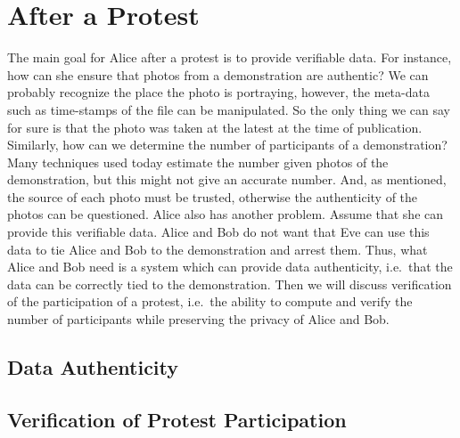 \section{After a Protest}
\label{AfterProtest}

The main goal for Alice after a protest is to provide verifiable data.
For instance, how can she ensure that photos from a demonstration are 
authentic?
We can probably recognize the place the photo is portraying, however, the 
meta-data such as time-stamps of the file can be manipulated.
So the only thing we can say for sure is that the photo was taken at the latest 
at the time of publication.
Similarly, how can we determine the number of participants of a demonstration?
Many techniques used today estimate the number given photos of the 
demonstration, but this might not give an accurate number.
And, as mentioned, the source of each photo must be trusted, otherwise the 
authenticity of the photos can be questioned.
Alice also has another problem.
Assume that she can provide this verifiable data.
Alice and Bob do not want that Eve can use this data to tie Alice
and Bob to the demonstration and arrest them.
Thus, what Alice and Bob need is a system which can provide data authenticity, 
i.e.\ that the data can be correctly tied to the demonstration.
Then we will discuss verification of the participation of a protest, i.e.\ the 
ability to compute and verify the number of participants while preserving the 
privacy of Alice and Bob.

  
\subsection{Data Authenticity}
\label{DataAuthenticity}



\subsection{Verification of Protest Participation}
\label{ProtestVerif}


